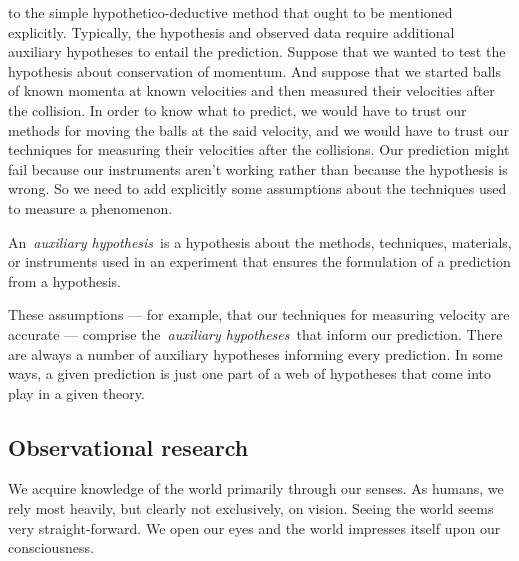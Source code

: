 \begin{refsection}
 to the simple hypothetico-deductive method that ought to be mentioned explicitly. Typically, the hypothesis and observed data require additional auxiliary hypotheses to entail the prediction. Suppose that we wanted to test the hypothesis about conservation of momentum. And suppose that we started balls of known momenta at known velocities and then measured their velocities after the collision. In order to know what to predict, we would have to trust our methods for moving the balls at the said velocity, and we would have to trust our techniques for measuring their velocities after the collisions. Our prediction might fail because our instruments aren’t working rather than because the hypothesis is wrong. So we need to add explicitly some assumptions about the techniques used to measure a phenomenon.\begin{thesis}\label{thesis:auxiliaryhypothesis}
An \emph{auxiliary hypothesis} is a hypothesis about the methods, techniques, materials, or instruments used in an experiment that ensures the formulation of a prediction from a hypothesis.\end{thesis}

These assumptions — for example, that our techniques for measuring velocity are accurate — comprise the \emph{auxiliary hypotheses} that inform our prediction. There are always a number of auxiliary hypotheses informing every prediction. In some ways, a given prediction is just one part of a web of hypotheses that come into play in a given theory.

\subsection{Observational research}
\label{observationalresearch}

We acquire knowledge of the world primarily through our senses. As humans, we rely most heavily, but clearly not exclusively, on vision. Seeing the world seems very straight-forward. We open our eyes and the world impresses itself upon our consciousness.
\begin{marginfigure}
 \begin{center}



\end{center}
\end{marginfigure}
\end{refsection}
